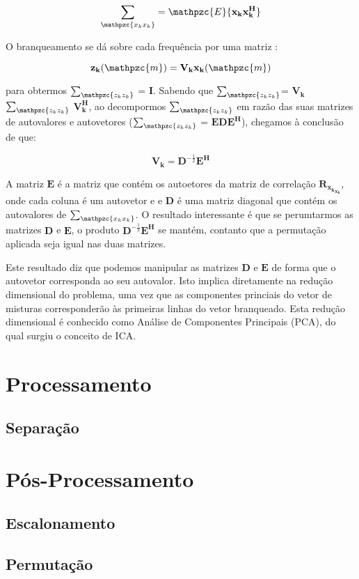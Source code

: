        \begin{equation}\label{eq:covariance}
            \sum_{\mathpzc{x_{k}x_{k}}} = \mathpzc{E}\{\mathbf{x_{k}x_{k}^H}\}
        \end{equation}
        
        O branqueamento se dá sobre cada frequência por uma matriz :
        
        \begin{equation}\label{eq:whiteningfrequency}
            \mathbf{z_k}(\mathpzc{m}) = \mathbf{V_k}\mathbf{x_k}(\mathpzc{m})
        \end{equation}
        
        para obtermos $\sum_{\mathpzc{z_{k}z_{k}}}$ = $\mathbf{I}$. Sabendo que $\sum_{\mathpzc{z_{k}z_{k}}}$= $\mathbf{V_k}$ $\sum_{\mathpzc{z_{k}z_{k}}}$ $\mathbf{V_k^H}$, ao decompormos $\sum_{\mathpzc{z_{k}z_{k}}}$ em razão das suas matrizes de autovalores e autovetores ($\sum_{\mathpzc{z_{k}z_{k}}}$ = $\mathbf{EDE^H}$), chegamos à conclusão de que:
        
        \begin{equation}\label{eq:vk}
            \mathbf{V_k} = \mathbf{D}^{-\frac{1}{2}}\mathbf{E^H}
        \end{equation}
        
        A matriz $\mathbf{E}$ é a matriz que contém os autoetores da matriz de correlação $\mathbf{R_{x_k}_{x_k}}$, onde cada coluna é um autovetor e e $\mathbf{D}$ é uma matriz diagonal que contém os autovalores de $\sum_{\mathpzc{x_{k}x_{k}}}$. O resultado interessante é que se perumtarmos as matrizes $\mathbf{D}$ e $\mathbf{E}$, o produto $\mathbf{D}^{-\frac{1}{2}}\mathbf{E^H}$ se mantém, contanto que a permutação aplicada seja igual nas duas matrizes.
        
        Este resultado diz que podemos manipular as matrizes $\mathbf{D}$ e $\mathbf{E}$ de forma que o autovetor corresponda ao seu autovalor. Isto implica diretamente na redução dimensional do problema, uma vez que as componentes princiais do vetor de misturas corresponderão às primeiras linhas do vetor branqueado. Esta redução dimensional é conhecido como Análise de Componentes Principais (PCA), do qual surgiu o conceito de ICA. 
\section{Processamento}
    \subsection{Separação}
\section{Pós-Processamento}
    \subsection{Escalonamento}
    \subsection{Permutação}